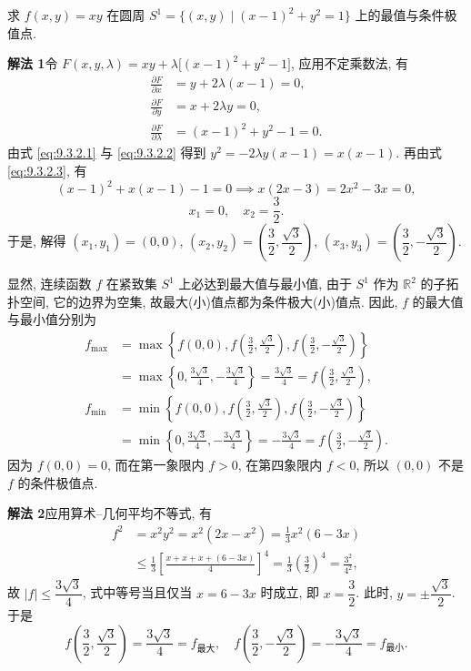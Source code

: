 \begin{example}\label{ex:9.3.2}
求 $f(x, y) = xy$ 在圆周 $S^{1} = \{(x, y) \mid (x - 1)^{2} + y^{2} = 1\}$ 上的最值与条件极值点.
\end{example}

\begin{solution}
\textbf{解法 1}\quad 令 $F(x, y, \lambda) = xy + \lambda\bigl[(x - 1)^{2} + y^{2} - 1\bigr]$, 应用不定乘数法, 有
\begin{align}
  \frac{\partial F}{\partial x} &= y + 2\lambda(x - 1) = 0, \label{eq:9.3.2.1} \\
  \frac{\partial F}{\partial y} &= x + 2\lambda y = 0, \label{eq:9.3.2.2} \\
  \frac{\partial F}{\partial \lambda} &= (x - 1)^{2} + y^{2} - 1 = 0. \label{eq:9.3.2.3}
\end{align}
由式 \eqref{eq:9.3.2.1} 与 \eqref{eq:9.3.2.2} 得到 $y^{2} = -2\lambda y(x - 1) = x(x - 1)$. 再由式 \eqref{eq:9.3.2.3}, 有
\[
  (x - 1)^{2} + x(x - 1) - 1 = 0 \implies x(2x - 3) = 2x^{2} - 3x = 0,
\]
\[
  x_{1} = 0, \quad x_{2} = \frac{3}{2}.
\]
于是, 解得 $(x_{1}, y_{1}) = (0, 0)$, $(x_{2}, y_{2}) = \left(\dfrac{3}{2}, \dfrac{\sqrt{3}}{2}\right)$, $(x_{3}, y_{3}) = \left(\dfrac{3}{2}, -\dfrac{\sqrt{3}}{2}\right)$.

显然, 连续函数 $f$ 在紧致集 $S^{1}$ 上必达到最大值与最小值, 由于 $S^{1}$ 作为 $\mathbb{R}^{2}$ 的子拓扑空间, 它的边界为空集, 故最大(小)值点都为条件极大(小)值点. 因此, $f$ 的最大值与最小值分别为
\begin{align*}
  f_{\max} &= \max\left\{f(0, 0), f\left(\frac{3}{2}, \frac{\sqrt{3}}{2}\right), f\left(\frac{3}{2}, -\frac{\sqrt{3}}{2}\right)\right\} \\
  &= \max\left\{0, \frac{3\sqrt{3}}{4}, -\frac{3\sqrt{3}}{4}\right\} = \frac{3\sqrt{3}}{4} = f\left(\frac{3}{2}, \frac{\sqrt{3}}{2}\right), \\
  f_{\min} &= \min\left\{f(0, 0), f\left(\frac{3}{2}, \frac{\sqrt{3}}{2}\right), f\left(\frac{3}{2}, -\frac{\sqrt{3}}{2}\right)\right\} \\
  &= \min\left\{0, \frac{3\sqrt{3}}{4}, -\frac{3\sqrt{3}}{4}\right\} = -\frac{3\sqrt{3}}{4} = f\left(\frac{3}{2}, -\frac{\sqrt{3}}{2}\right).
\end{align*}
因为 $f(0, 0) = 0$, 而在第一象限内 $f > 0$, 在第四象限内 $f < 0$, 所以 $(0, 0)$ 不是 $f$ 的条件极值点.

\textbf{解法 2}\quad 应用算术--几何平均不等式, 有
\begin{align*}
  f^{2} &= x^{2}y^{2} = x^{2}(2x - x^{2}) = \frac{1}{3}x^{2}(6 - 3x) \\
  &\leqslant \frac{1}{3}\left[\frac{x + x + x + (6 - 3x)}{4}\right]^{4} = \frac{1}{3}\left(\frac{3}{2}\right)^{4} = \frac{3^{2}}{4^{2}},
\end{align*}
故 $|f| \leqslant \dfrac{3\sqrt{3}}{4}$, 式中等号当且仅当 $x = 6 - 3x$ 时成立, 即 $x = \dfrac{3}{2}$. 此时, $y = \pm\dfrac{\sqrt{3}}{2}$. 于是
\[
  f\left(\frac{3}{2}, \frac{\sqrt{3}}{2}\right) = \frac{3\sqrt{3}}{4} = f_{\text{最大}}, \quad f\left(\frac{3}{2}, -\frac{\sqrt{3}}{2}\right) = -\frac{3\sqrt{3}}{4} = f_{\text{最小}}.
\]
\end{solution}

